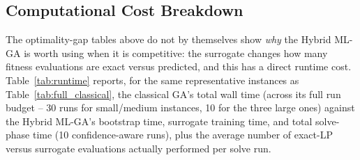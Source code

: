 \documentclass[conference]{IEEEtran}
\begin{document}
\subsection{Computational Cost Breakdown}

The optimality-gap tables above do not by themselves show \emph{why} the
Hybrid ML-GA is worth using when it is competitive: the surrogate changes how
many fitness evaluations are exact versus predicted, and this has a direct
runtime cost. Table~\ref{tab:runtime} reports, for the same representative
instances as Table~\ref{tab:full_classical}, the classical GA's total wall
time (across its full run budget -- 30 runs for small/medium instances, 10 for
the three large ones) against the Hybrid ML-GA's bootstrap time, surrogate
training time, and total solve-phase time (10 confidence-aware runs), plus the
average number of exact-LP versus surrogate evaluations actually performed
per solve run.

\begin{table}[t]
\centering
\caption{Computational cost breakdown (representative instances). Classical GA time is the full run budget (30 runs small/medium, 10 runs large); Hybrid ML-GA time is bootstrap + train + 10 solve runs. Evals columns are per-solve-run averages.}
\label{tab:runtime}
\end{table}
\end{document}

